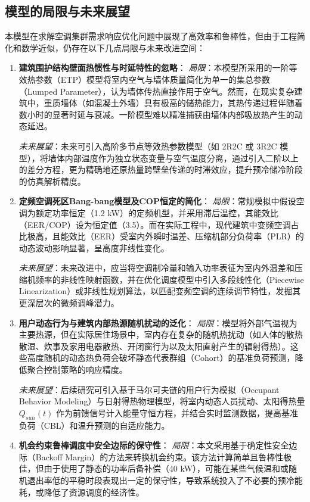 \documentclass[12pt,a4paper]{article}
\begin{document}
\subsection{模型的局限与未来展望}
本模型在求解空调集群需求响应优化问题中展现了高效率和鲁棒性，但由于工程简化和数学近似，仍存在以下几点局限与未来改进空间：

\begin{enumerate}
    \item \textbf{建筑围护结构壁面热惯性与时延特性的忽略}：
    \textit{局限}：本模型所采用的一阶等效热参数（ETP）模型将室内空气与墙体质量简化为单一的集总参数（Lumped Parameter），认为墙体传热直接作用于空气。然而，在现实复杂建筑中，重质墙体（如混凝土外墙）具有极高的储热能力，其热传递过程伴随着数小时的显著时延与衰减。一阶模型难以精准捕获由墙体内部吸放热产生的动态延迟。
    
    \textit{未来展望}：未来可引入高阶多节点等效热参数模型（如 2R2C 或 3R2C 模型），将墙体内部温度作为独立状态变量与空气温度分离，通过引入二阶以上的差分方程，更为精确地还原热量跨壁垒传递的时滞效应，提升预冷储冷阶段的仿真解析精度。
    
    \item \textbf{定频空调死区Bang-bang模型及COP恒定的简化}：
    \textit{局限}：常规模拟中假设空调为额定功率恒定（1.2 kW）的定频机型，并采用滞后温控，其能效比（EER/COP）设为恒定值（3.5）。而在实际工程中，现代建筑中变频空调占比极高，且能效比（EER）受室内外瞬时温差、压缩机部分负荷率（PLR）的动态波动影响显著，呈高度非线性变化。
    
    \textit{未来展望}：未来改进中，应当将空调制冷量和输入功率表征为室内外温差和压缩机频率的非线性映射函数，并在优化调度模型中引入多段线性化（Piecewise Linearization）或非线性规划算法，以匹配变频空调的连续调节特性，发掘其更深层次的微频调峰潜力。
    
    \item \textbf{用户动态行为与建筑内部热源随机扰动的泛化}：
    \textit{局限}：模型将外部气温视为主要热源，但在实际居住场景中，室内存在复杂的随机热扰动（如人体的散热散湿、炊事及家用电器散热、开闭窗行为以及太阳直射产生的辐射得热）。这些高度随机的动态热负荷会破坏静态代表群组（Cohort）的基准负荷预测，降低聚合控制策略的响应精度。
    
    \textit{未来展望}：后续研究可引入基于马尔可夫链的用户行为模拟（Occupant Behavior Modeling）与日射得热物理模型，将室内动态人员扰动、太阳得热量 $Q_{sun}(t)$ 作为前馈信号计入能量守恒方程，并结合实时监测数据，提高基准负荷（CBL）和温升预测的自适应能力。
    
    \item \textbf{机会约束鲁棒调度中安全边际的保守性}：
    \textit{局限}：本文采用基于确定性安全边际（Backoff Margin）的方法来转换机会约束。该方法计算简单且鲁棒性极佳，但由于使用了静态的功率后备补偿（40 kW），可能在某些气候温和或随机退出率低的平稳时段表现出一定的保守性，导致系统投入了不必要的预冷能耗，或降低了资源调度的经济性。
    

\end{enumerate}
\end{document}
